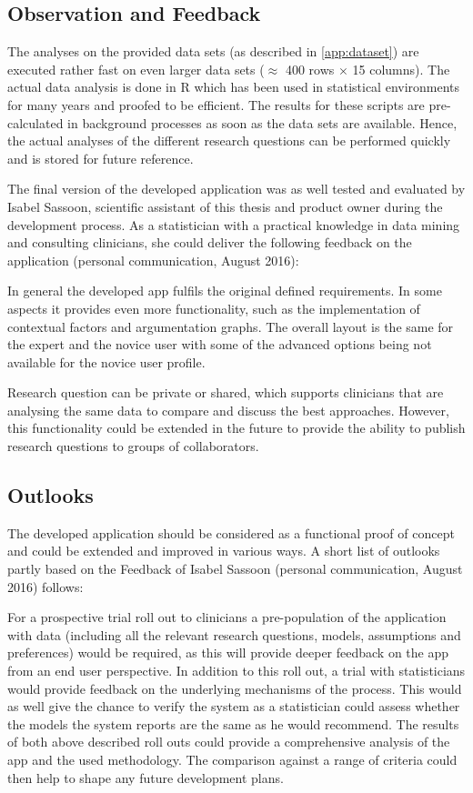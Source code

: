 \subsection{Observation and Feedback}
\sloppy

The analyses on the provided data sets (as described in \autoref{app:dataset}) are executed rather fast on even larger data sets ($\approx$ 400 rows $\times$ 15 columns). The actual data analysis is done in \gls{R} which has been used in statistical environments for many years and proofed to be efficient. The results for these scripts are pre-calculated in background processes as soon as the data sets are available. Hence, the actual analyses of the different research questions can be performed quickly and is stored for future reference.

The final version of the developed application was as well tested and evaluated by Isabel Sassoon, scientific assistant of this thesis and product owner during the development process. As a statistician with a practical knowledge in data mining and consulting clinicians, she could deliver the following feedback on the application (personal communication, August 2016):

In general the developed app fulfils the original defined requirements. In some aspects it provides even more functionality, such as the implementation of contextual factors and argumentation graphs. The overall layout is the same for the expert and the novice user with some of the advanced options being not available for the novice user profile.

Research question can be private or shared, which supports clinicians that are analysing the same data to compare and discuss the best approaches. However, this functionality could be extended in the future to provide the ability to publish research questions to groups of collaborators.


\subsection{Outlooks}
\label{sub:outlooks}

The developed application should be considered as a functional proof of concept and could be extended and improved in various ways. A short list of outlooks partly based on the Feedback of Isabel Sassoon (personal communication, August 2016) follows:

For a prospective trial roll out to clinicians a pre-population of the application with data (including  all the relevant research questions, models, assumptions and preferences) would be required, as this will provide deeper feedback on the app from an end user perspective. In addition to this roll out, a trial with statisticians would provide feedback on the underlying mechanisms of the process. This would as well give the chance to verify the system as a statistician could assess whether the models the system reports are the same as he would recommend. The results of both above described roll outs could provide a comprehensive analysis of the app and the used methodology. The comparison against a range of criteria could then help to shape any future development plans.

